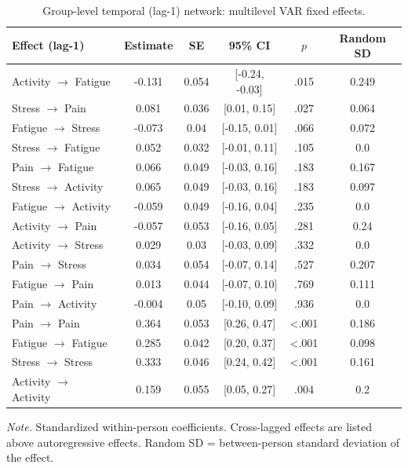 \begin{table}[H]
\raggedright
\caption{Group-level temporal (lag-1) network: multilevel VAR fixed effects.}
\label{tab:temporal}
\footnotesize
\begingroup
\setlength{\tabcolsep}{4pt}
\renewcommand{\arraystretch}{1.08}
\noindent
\begin{tabular*}{\textwidth}{@{\extracolsep{\fill}}lccccc@{}}
\toprule
Effect (lag-1) & Estimate & SE & 95\% CI & $p$ & Random SD \\
\midrule
Activity $\rightarrow$ Fatigue & -0.131 & 0.054 & [-0.24, -0.03] & .015 & 0.249 \\
Stress $\rightarrow$ Pain & 0.081 & 0.036 & [0.01, 0.15] & .027 & 0.064 \\
Fatigue $\rightarrow$ Stress & -0.073 & 0.04 & [-0.15, 0.01] & .066 & 0.072 \\
Stress $\rightarrow$ Fatigue & 0.052 & 0.032 & [-0.01, 0.11] & .105 & 0.0 \\
Pain $\rightarrow$ Fatigue & 0.066 & 0.049 & [-0.03, 0.16] & .183 & 0.167 \\
Stress $\rightarrow$ Activity & 0.065 & 0.049 & [-0.03, 0.16] & .183 & 0.097 \\
Fatigue $\rightarrow$ Activity & -0.059 & 0.049 & [-0.16, 0.04] & .235 & 0.0 \\
Activity $\rightarrow$ Pain & -0.057 & 0.053 & [-0.16, 0.05] & .281 & 0.24 \\
Activity $\rightarrow$ Stress & 0.029 & 0.03 & [-0.03, 0.09] & .332 & 0.0 \\
Pain $\rightarrow$ Stress & 0.034 & 0.054 & [-0.07, 0.14] & .527 & 0.207 \\
Fatigue $\rightarrow$ Pain & 0.013 & 0.044 & [-0.07, 0.10] & .769 & 0.111 \\
Pain $\rightarrow$ Activity & -0.004 & 0.05 & [-0.10, 0.09] & .936 & 0.0 \\
Pain $\rightarrow$ Pain & 0.364 & 0.053 & [0.26, 0.47] & <.001 & 0.186 \\
Fatigue $\rightarrow$ Fatigue & 0.285 & 0.042 & [0.20, 0.37] & <.001 & 0.098 \\
Stress $\rightarrow$ Stress & 0.333 & 0.046 & [0.24, 0.42] & <.001 & 0.161 \\
Activity $\rightarrow$ Activity & 0.159 & 0.055 & [0.05, 0.27] & .004 & 0.2 \\
\bottomrule
\end{tabular*}
\par\vspace{3pt}\noindent\parbox{\textwidth}{\footnotesize\textit{Note.} Standardized within-person coefficients. Cross-lagged effects are listed above autoregressive effects. Random SD = between-person standard deviation of the effect.}
\endgroup
\end{table}
